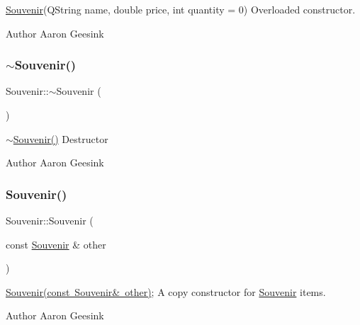 \mbox{\hyperlink{class_souvenir}{Souvenir}}(Q\+String name, double price, int quantity = 0) Overloaded constructor. 

\begin{DoxyAuthor}{Author}
Aaron Geesink 
\end{DoxyAuthor}
\mbox{\label{class_souvenir_ab65358c1194ede77807d924287bc5685}} 
\subsubsection{\texorpdfstring{$\sim$Souvenir()}{~Souvenir()}}
{\footnotesize\ttfamily Souvenir\+::$\sim$\+Souvenir (\begin{DoxyParamCaption}{ }\end{DoxyParamCaption})}



\mbox{\hyperlink{class_souvenir_ab65358c1194ede77807d924287bc5685}{$\sim$\+Souvenir()}} Destructor 

\begin{DoxyAuthor}{Author}
Aaron Geesink 
\end{DoxyAuthor}
\mbox{\label{class_souvenir_a358e41f53d1806aa00b8b1f2f31f4e11}} 
\subsubsection{\texorpdfstring{Souvenir()}{Souvenir()}\hspace{0.1cm}{\footnotesize\ttfamily [3/4]}}
{\footnotesize\ttfamily Souvenir\+::\+Souvenir (\begin{DoxyParamCaption}\item[{const \mbox{\hyperlink{class_souvenir}{Souvenir}} \&}]{other }\end{DoxyParamCaption})}



\mbox{\hyperlink{class_souvenir_a358e41f53d1806aa00b8b1f2f31f4e11}{Souvenir(const Souvenir\& other)}}; A copy constructor for \mbox{\hyperlink{class_souvenir}{Souvenir}} items. 

\begin{DoxyAuthor}{Author}
Aaron Geesink 
\end{DoxyAuthor}
\mbox{\label{class_souvenir_a6486f07a7463ea7da5b947fd555c512d}} 
